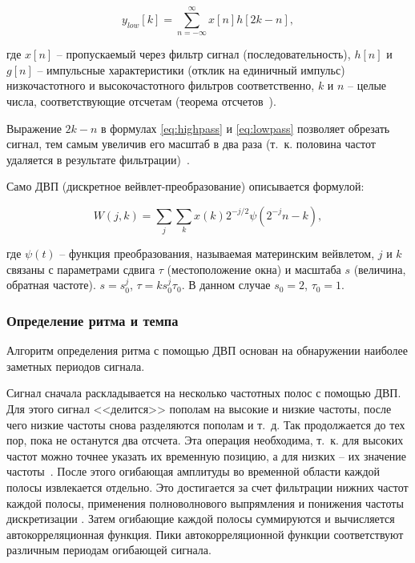 \begin{equation}\label{eq:lowpass}
	y_{low}[k] = \sum_{n=-\infty}^{\infty} x[n] h[2k-n],
\end{equation}

где $x[n]$ -- пропускаемый через фильтр сигнал (последовательность), $h[n]$ и $g[n]$ -- импульсные характеристики (отклик на единичный импульс) низкочастотного и высокочастотного фильтров соответственно, $k$ и $n$ -- целые числа, соответствующие отсчетам (теорема отсчетов~\cite{samples}).

Выражение $2k-n$ в формулах \ref{eq:highpass} и \ref{eq:lowpass} позволяет обрезать сигнал, тем самым увеличив его масштаб в два раза (т.~к. половина частот удаляется в результате фильтрации)~\cite{polikar}.

Само ДВП (дискретное вейвлет-преобразование) описывается формулой:

\begin{equation}\label{eq:dwt}
	W(j, k) = \sum_{j}\sum_{k} x(k) 2^{-j/2} \psi(2^{-j}n-k),
\end{equation}

где $\psi(t)$ -- функция преобразования, называемая материнским вейвлетом, $j$ и $k$ связаны с параметрами сдвига $\tau$ (местоположение окна) и масштаба $s$ (величина, обратная частоте). $s = s_0^j$, $\tau = k s_0^j \tau_0$. В данном случае $s_0 = 2$, $\tau_0 = 1$.

\subsubsection{Определение ритма и темпа}

Алгоритм определения ритма с помощью ДВП основан на обнаружении наиболее заметных периодов сигнала.

Сигнал сначала раскладывается на несколько частотных полос с помощью ДВП. Для этого сигнал <<делится>> пополам на высокие и низкие частоты, после чего низкие частоты снова разделяются пополам и т.~д. Так продолжается до тех пор, пока не останутся два отсчета. Эта операция необходима, т.~к. для высоких частот можно точнее указать их временную позицию, а для низких -- их значение частоты~\cite{polikar}. После этого огибающая амплитуды во временной области каждой полосы извлекается отдельно. Это достигается за счет фильтрации нижних частот каждой полосы, применения полноволнового выпрямления и понижения частоты дискретизации \cite{dwt}. Затем огибающие каждой полосы суммируются и вычисляется автокорреляционная функция. Пики автокорреляционной функции соответствуют различным периодам огибающей сигнала.

